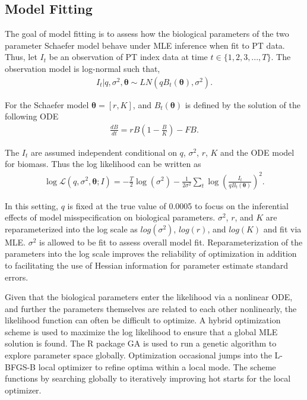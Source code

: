 \documentclass[12pt]{article}
\begin{document}
%
\clearpage
\subsection{Model Fitting\label{modelFit}}

%
The goal of model fitting is to assess how the biological parameters of the 
two parameter Schaefer model behave under MLE inference when fit to PT data. 
Thus, let $I_t$ be an observation of PT index data at time $t\in\{1,2, 3,..., T\}$. The observation 
model is log-normal such that,
%
\begin{align}
I_t| q, \sigma^2, \bm{\theta} \sim LN(qB_t(\bm{\theta}), \sigma^2).
\end{align}

For the Schaefer model $\bm{\theta}=[r, K]$, and $B_t(\bm{\theta})$ is defined 
by the solution of the following ODE
%
\begin{align}
\frac{dB}{dt} = r B \left(1-\frac{B}{K}\right) - FB. \label{odeS}
\end{align}

The $I_t$ are assumed independent conditional on $q$, $\sigma^2$, $r$, $K$ 
and the ODE model for biomass. Thus the log likelihood can be written as 
%
\begin{align}
\log\mathcal{L}(q, \sigma^2, \bm{\theta}; I) = - \frac{T}{2}\log(\sigma^2) - \frac{1}{2\sigma^2}\sum_t \log\left(\frac{I_t}{qB_t(\bm{\theta})}\right)^2. \label{logLike}
\end{align}

%
In this setting, $q$ is fixed at the true value of 0.0005 to focus on the 
inferential effects of model misspecification on biological parameters. 
$\sigma^2$, $r$, and $K$ are reparameterized into the log scale as 
$log(\sigma^2)$, $log(r)$, and $log(K)$ and fit via MLE. $\sigma^2$ is
allowed to be fit to assess overall model fit. Reparameterization 
of the parameters into the log scale improves the reliability of optimization
in addition to facilitating the use of Hessian information for parameter 
estimate standard errors.

%
Given that the biological parameters enter the likelihood via a nonlinear ODE, 
and further the parameters themselves are related to each other nonlinearly, 
the likelihood function can often be difficult to optimize. A hybrid optimization 
scheme is used to maximize the log likelihood to ensure that a global MLE solution 
is found. The R package GA  is 
used to run a genetic algorithm to explore parameter space globally. 
Optimization occasional jumps into the L-BFGS-B local optimizer to refine 
optima within a local mode. The scheme functions by searching globally to 
iteratively improving hot starts for the local optimizer. 
\end{document}
